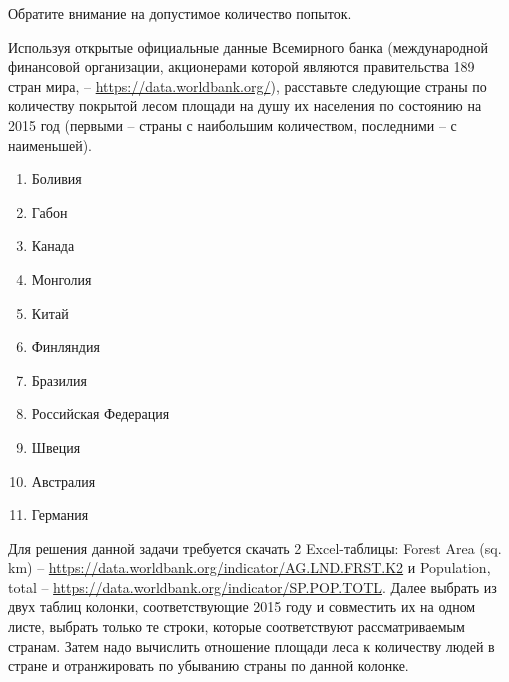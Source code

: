 
Обратите внимание на допустимое количество попыток.

Используя открытые официальные данные Всемирного банка (международной финансовой организации, акционерами которой являются правительства 189 стран мира, – \url{https://data.worldbank.org/}), расставьте следующие страны по количеству покрытой лесом площади на душу их населения по состоянию на 2015 год (первыми – страны с наибольшим количеством, последними – с наименьшей).

\begin{enumerate}
    \item Боливия
    \item Габон
    \item Канада
    \item Монголия
    \item Китай
    \item Финляндия
    \item Бразилия
    \item Российская Федерация
    \item Швеция
    \item Австралия
    \item Германия
\end{enumerate}

\solutionSection
Для решения данной задачи требуется скачать 2 Excel-таблицы: Forest Area (sq. km) -- \url{https://data.worldbank.org/indicator/AG.LND.FRST.K2} и Population, total -- \url{https://data.worldbank.org/indicator/SP.POP.TOTL}. Далее выбрать из двух таблиц колонки, соответствующие 2015 году и совместить их на одном листе, выбрать только те строки, которые соответствуют рассматриваемым странам. Затем надо вычислить отношение площади леса к количеству людей в стране и отранжировать по убыванию страны по данной колонке.

